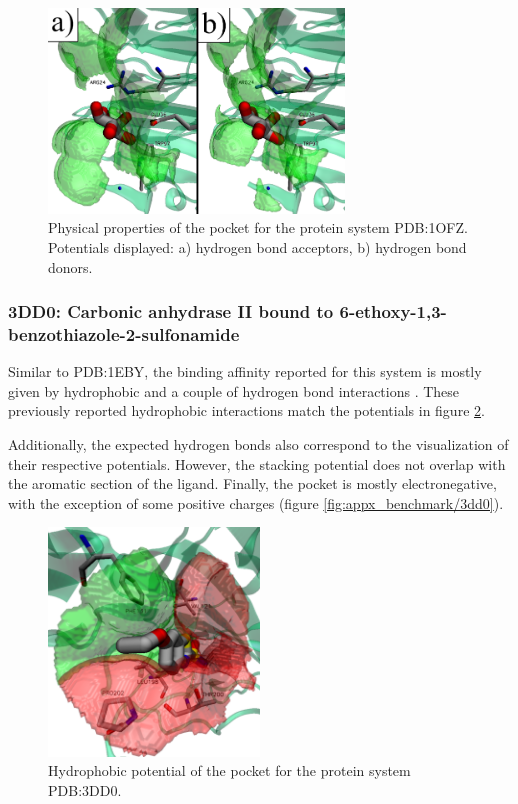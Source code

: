       \begin{figure}[H]
        \centering
        \includegraphics[width=0.7\textwidth]{figures/results/benchmark_prot/1ofz.png}
        \caption{\label{fig:benchmark/1ofz} Physical properties of the pocket for the protein system PDB:1OFZ. Potentials displayed: a) hydrogen bond acceptors, b) hydrogen bond donors.}
      \end{figure}
    \pagebreak

    \subsubsection{3DD0: Carbonic anhydrase II bound to 6-ethoxy-1,3-benzothiazole-2-sulfonamide}
      Similar to PDB:1EBY, the binding affinity reported for this system is mostly given by hydrophobic and a couple of hydrogen bond interactions \cite{benchmark_strong_2021}. These previously reported hydrophobic interactions match the potentials in figure \ref{fig:benchmark/3dd0}.

      Additionally, the expected hydrogen bonds also correspond to the visualization of their respective potentials. However, the stacking potential does not overlap with the aromatic section of the ligand. Finally, the pocket is mostly electronegative, with the exception of some positive charges (figure \ref{fig:appx_benchmark/3dd0}).

      \begin{figure}[H]
        \centering
        \includegraphics[width=0.5\textwidth]{figures/results/benchmark_prot/3dd0.png}
        \caption{\label{fig:benchmark/3dd0} Hydrophobic potential of the pocket for the protein system PDB:3DD0.}
      \end{figure}
    \pagebreak

